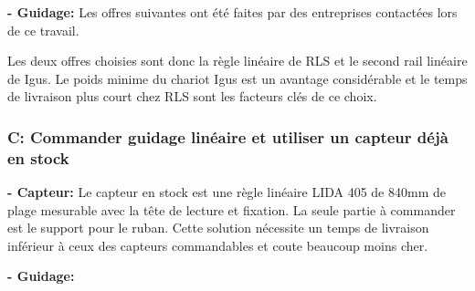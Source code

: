 \textbf{ - Guidage:}
\newline
Les offres suivantes ont été faites par des entreprises contactées lors de ce travail.

\begin{table}[H]
    \centering
    \caption{Offres pour le guidage}
    \label{tab:OffreGuid}
\end{table}

Les deux offres choisies sont donc la règle linéaire de RLS et le second rail linéaire de Igus. Le poids minime du chariot Igus est un avantage considérable
et le temps de livraison plus court chez RLS sont les facteurs clés de ce choix.

\subsubsection{C: Commander guidage linéaire et utiliser un capteur déjà en stock}
\textbf{ - Capteur:}
\newline
Le capteur en stock est une règle linéaire LIDA 405 de 840mm de plage mesurable avec la tête de lecture et fixation. La seule partie à commander
est le support pour le ruban. Cette solution nécessite un temps de livraison inférieur à ceux des capteurs commandables et coute beaucoup moins cher.

\textbf{ - Guidage:}
\newline

